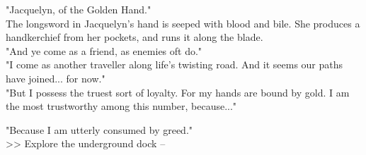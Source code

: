 "Jacquelyn, of the Golden Hand."\\

The longsword in Jacquelyn's hand is seeped with blood and bile. She produces a handkerchief from her pockets, and runs it along the blade.\\

"And ye come as a friend, as enemies oft do."\\

"I come as another traveller along life's twisting road. And it seems our paths have joined... for now."\\

"But I possess the truest sort of loyalty. For my hands are bound by gold. I am the most trustworthy among this number, because..."

"Because I am utterly consumed by greed."\\

>> Explore the underground dock -- 